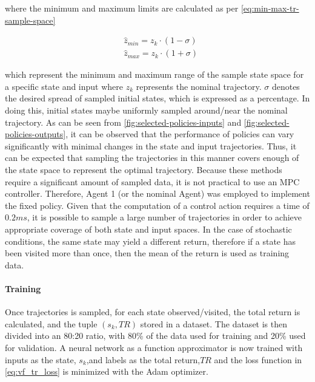 where the minimum and maximum limits are calculated as per \autoref{eq:min-max-tr-sample-space}

\begin{equation}\label{eq:min-max-tr-sample-space}
\begin{aligned}
    &\hat{z}_{min} = z_k \cdot (1-\sigma)\\
    &\hat{z}_{max} = z_k \cdot (1+\sigma)
\end{aligned}
\end{equation}

which represent the minimum and maximum range of the sample state space for a specific state and input where ${z}_{k}$ represents the nominal trajectory. $\sigma$ denotes the desired spread of sampled initial states, which is expressed as a percentage.
In doing this, initial states maybe uniformly sampled around/near the nominal trajectory. As can be seen from \autoref{fig:selected-policies-inputs} and \autoref{fig:selected-policies-outputs}, it can be observed that the performance of policies can vary significantly with minimal changes in the  state and input trajectories. Thus, it can be expected that sampling the trajectories in this manner covers enough of the state space to represent the optimal trajectory. Because these methods require a significant amount of sampled data, it is not practical to use an MPC controller. Therefore, Agent 1 (or the nominal Agent) was employed to implement the fixed policy. Given that the computation of a control action requires a time of $0.2 ms$, it is possible to sample a large number of trajectories in order to achieve appropriate coverage of both state and input spaces.
In the case of stochastic conditions, the same state may yield a different return, therefore if a state has been visited more than once, then the mean of the return is used as training data.

\paragraph{Training}
Once trajectories is sampled, for each state observed/visited, the total return is calculated, and the tuple $(s_k,TR)$ stored in a dataset. The dataset is then divided into an 80:20 ratio, with 80\% of the data used for training and 20\% used for validation.  A neural network as a function approximator is now trained with inputs as the state, $s_k$,and labels as the total return,$TR$ and the loss function in \autoref{eq:vf_tr_loss} is minimized with the Adam optimizer.

